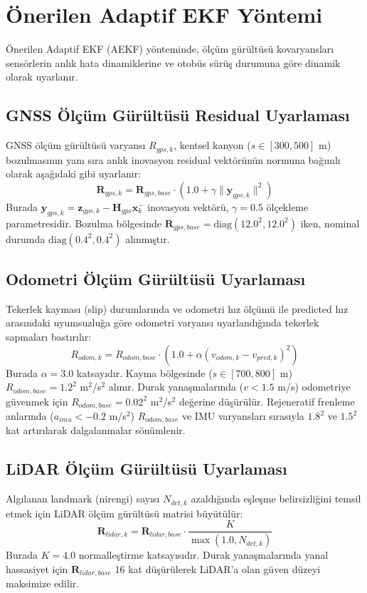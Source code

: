 ﻿\documentclass[conference]{IEEEtran}
\begin{document}
\section{Önerilen Adaptif EKF Yöntemi}
Önerilen Adaptif EKF (AEKF) yönteminde, ölçüm gürültüsü kovaryansları sensörlerin anlık hata dinamiklerine ve otobüs sürüş durumuna göre dinamik olarak uyarlanır.

\subsection{GNSS Ölçüm Gürültüsü Residual Uyarlaması}
GNSS ölçüm gürültüsü varyansı $R_{gps, k}$, kentsel kanyon ($s \in [300, 500]$ m) bozulmasının yanı sıra anlık inovasyon residual vektörünün normuna bağımlı olarak aşağıdaki gibi uyarlanır:
\begin{equation}
\mathbf{R}_{gps, k} = \mathbf{R}_{gps, base} \cdot (1.0 + \gamma \|\mathbf{y}_{gps, k}\|^2)
\end{equation}
Burada $\mathbf{y}_{gps, k} = \mathbf{z}_{gps, k} - \mathbf{H}_{gps} \mathbf{x}_k^-$ inovasyon vektörü, $\gamma = 0.5$ ölçekleme parametresidir. Bozulma bölgesinde $\mathbf{R}_{gps, base} = \text{diag}(12.0^2, 12.0^2)$ iken, nominal durumda $\text{diag}(0.4^2, 0.4^2)$ alınmıştır.

\subsection{Odometri Ölçüm Gürültüsü Uyarlaması}
Tekerlek kayması (slip) durumlarında ve odometri hız ölçümü ile predicted hız arasındaki uyumsuzluğa göre odometri varyansı uyarlandığında tekerlek sapmaları bastırılır:
\begin{equation}
R_{odom, k} = R_{odom, base} \cdot (1.0 + \alpha (v_{odom, k} - v_{pred, k})^2)
\end{equation}
Burada $\alpha = 3.0$ katsayıdır. Kayma bölgesinde ($s \in [700, 800]$ m) $R_{odom, base} = 1.2^2$ m$^2$/s$^2$ alınır. Durak yanaşmalarında ($v < 1.5$ m/s) odometriye güvenmek için $R_{odom, base} = 0.02^2$ m$^2$/s$^2$ değerine düşürülür. Rejeneratif frenleme anlarında ($a_{imu} < -0.2$ m/s$^2$) $R_{odom, base}$ ve IMU varyansları sırasıyla $1.8^2$ ve $1.5^2$ kat artırılarak dalgalanmalar sönümlenir.

\subsection{LiDAR Ölçüm Gürültüsü Uyarlaması}
Algılanan landmark (nirengi) sayısı $N_{det, k}$ azaldığında eşleşme belirsizliğini temsil etmek için LiDAR ölçüm gürültüsü matrisi büyütülür:
\begin{equation}
\mathbf{R}_{lidar, k} = \mathbf{R}_{lidar, base} \cdot \frac{K}{\max(1.0, N_{det, k})}
\end{equation}
Burada $K = 4.0$ normalleştirme katsayısıdır. Durak yanaşmalarında yanal hassasiyet için $\mathbf{R}_{lidar, base}$ 16 kat düşürülerek LiDAR'a olan güven düzeyi maksimize edilir.
\end{document}
